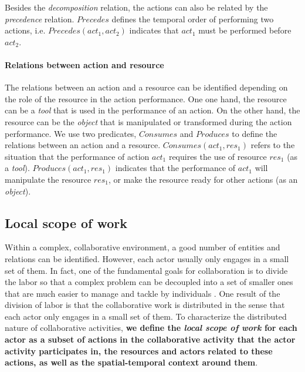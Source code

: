 Besides the \emph{decomposition} relation, the actions can also be related by the \emph{precedence} relation. $Precedes$ defines the temporal order of performing two actions, i.e. $Precedes(act_1, act_2)$ indicates that $act_1$ must be performed before $act_2$. 

\paragraph*{Relations between action and resource} %
\label{par:relations_between_action_and_resource}
The relations between an action and a resource can be identified depending on the role of the resource in the action performance. One one hand, the resource can be a \emph{tool} that is used in the performance of an action. On the other hand, the resource can be the \emph{object} that is manipulated or transformed during the action performance. We use two predicates, $Consumes$ and $Produces$ to define the relations between an action and a resource. $Consumes(act_1, res_1)$ refers to the situation that the performance of action $act_1$ requires the use of resource $res_1$  (as a \emph{tool}). $Produces(act_1, res_1)$ indicates that the performance of $act_1$ will manipulate the resource $res_1$, or make the resource ready for other actions (as an \emph{object}).

\subsection{Local scope of work} %
\label{sub:local_scope_of_work}
Within a complex, collaborative environment, a good number of entities and relations can be identified. However, each actor usually only engages in a small set of them. In fact, one of the fundamental goals for collaboration is to divide the labor so that a complex problem can be decoupled into a set of smaller ones that are much easier to manage and tackle by individuals \cite{schmidt1992taking}. One result of the division of labor is that the collaborative work is distributed in the sense that each actor only engages in a small set of them. To characterize the distributed nature of collaborative activities, \textbf{we define the \emph{local scope of work} for each actor as a subset of actions in the collaborative activity that the actor activity participates in, the resources and actors related to these actions, as well as the spatial-temporal context around them}.

